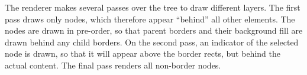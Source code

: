 


 

The renderer makes several passes over the tree to draw different layers. The first pass draws only  nodes, which therefore appear ``behind'' all other elements. The nodes are drawn in pre-order, so that parent borders and their background fill are drawn behind any child borders. On the second pass, an indicator of the selected node is drawn, so that it will appear above the border rects, but behind the actual content. The final pass renders all non-border nodes.


